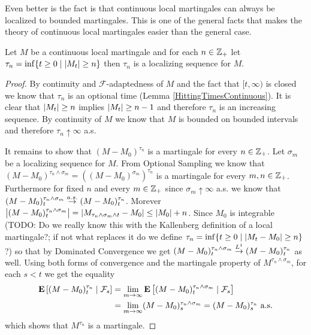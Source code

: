 Even better is the fact is that continuous local martingales can always be localized to bounded martingales.  This is one of the general facts that makes the theory of continuous local martingales easier than the general case.
\begin{lem}\label{ContinuousLocalMartingaleLocalizeToBounded}Let $M$ be a continuous local martingale and for each $n \in \integers_+$ let $\tau_n = \inf \lbrace t \geq 0 \mid \abs{M_t} \geq n \rbrace$ then $\tau_n$ is a localizing sequence for $M$.
\end{lem}
\begin{proof}
By continuity and $\mathcal{F}$-adaptedness of $M$ and the fact that $[t, \infty)$ is closed we know that $\tau_n$ is an optional time (Lemma \ref{HittingTimesContinuous}). It is clear that $\abs{M_t} \geq n$ implies $\abs{M_t} \geq n-1$ and therefore $\tau_n$ is an increasing sequence.  By continuity of $M$ we know that $M$ is bounded on bounded intervals and therefore $\tau_n \uparrow \infty$ a.s.  

It remains to show that $(M - M_0)^{\tau_n}$ is a martingale for every $n \in \integers_+$.   Let $\sigma_m$ be a localizing sequence for $M$.  From Optional Sampling we know that $(M - M_0)^{\tau_n \wedge \sigma_m} = ((M-M_0)^{\sigma_m})^{\tau_n}$ is a martingale for every $m,n \in \integers_+$.  Furthermore for fixed $n$ and every $m \in \integers_+$ since $\sigma_m \uparrow \infty$ a.s. we know that $(M-M_0)^{\tau_n \wedge \sigma_m}_t \toas (M-M_0)^{\tau_n}_t$.  Morever $\abs{(M-M_0)^{\tau_n \wedge \sigma_m}_t } = \abs{M_{\tau_n \wedge \sigma_m \wedge t} - M_0} \leq \abs{M_0} + n$.  Since $M_0$ is integrable (TODO: Do we really know this with the Kallenberg definition of a local martingale?; if not what replaces it do we define $\tau_n = \inf \lbrace t \geq 0 \mid \abs{M_t - M_0} \geq n \rbrace$?) so that by Dominated Convergence we get $(M-M_0)^{\tau_n \wedge \sigma_m}_t \tolp{1} (M-M_0)^{\tau_n}_t$ as well. Using both forms of convergence and the martingale property of $M^{\tau_n \wedge \sigma_m}$, for each $s < t$ we get the equality
\begin{align*}
\cexpectationlong{\mathcal{F}_s}{(M - M_0)^{\tau_n}_t} &= \lim_{m \to \infty} \cexpectationlong{\mathcal{F}_s}{(M - M_0)^{\tau_n \wedge \sigma_m }_t} \\
&= \lim_{m \to \infty} (M - M_0)^{\tau_n \wedge \sigma_m }_s =  (M - M_0)^{\tau_n }_s \text{ a.s.}
\end{align*}
which shows that $M^{\tau_n}$ is a martingale.
\end{proof}

